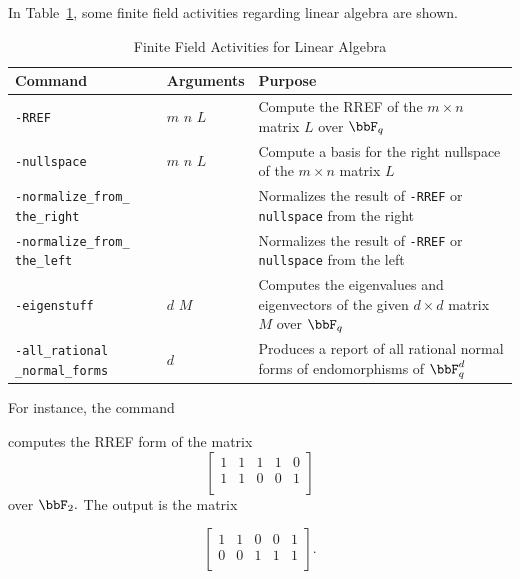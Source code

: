 In Table~\ref{tab:linear:algebra}, some finite field activities regarding linear algebra are shown.
\begin{table}
	\begin{center}
	\begin{tabular}{|p{4cm}|p{3cm}|p{7cm}|}
		\hline
		Command & Arguments & Purpose \\
		\hline
		\hline
		\verb'-RREF' & $m$ $n$ $L$ & Compute the RREF of the $m \times n$ matrix $L$ over $\bbF_q$\\
		\hline
		\verb'-nullspace' & $m$ $n$ $L$  & Compute a basis for the right nullspace of the $m \times n$ matrix $L$\\
		\hline
		\verb'-normalize_from_' \verb'the_right' &  & Normalizes the result of \verb'-RREF' or \verb'nullspace' from the right\\
		\hline
		\verb'-normalize_from_' \verb'the_left' &  & Normalizes the result of \verb'-RREF' or \verb'nullspace' from the left\\
		\hline
		\verb'-eigenstuff' & $d$  $M$ & Computes the eigenvalues and eigenvectors of the given $d \times d$ matrix $M$ over $\bbF_q$\\
		\hline
		\verb'-all_rational' \verb'_normal_forms' & $d$   & Produces a report of all rational normal forms of endomorphisms of $\bbF_q^d$\\
		\hline
		\end{tabular}
	\end{center}
	\caption{\label{tab:linear:algebra}Finite Field Activities for Linear Algebra}
	\end{table}
For instance, the command
{\tt

}
computes the RREF form of the 
matrix 
$$
\left[
\begin{array}{ccccc}
1&1&1&1&0\\
1&1&0&0&1\\
\end{array}
\right]
$$
over $\bbF_2.$
The output is the matrix 
\begin{mdframed}[style=MyFrame]
$$
\left[
\begin{array}{*{5}{c}}
1 & 1 & 0 & 0 & 1\\
0 & 0 & 1 & 1 & 1\\
\end{array}
\right].
$$
\end{mdframed}

